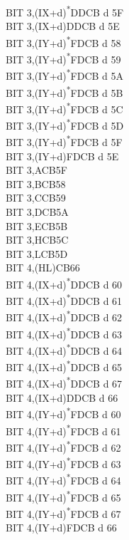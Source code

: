 \documentclass[twoside,openright,a4paper]{book}
\begin{document}
\begin{multicols}{3}
{\begin{tabbing}
	BIT 3,(IX+d)\textsuperscript{*}\>DDCB d 5F\\
	BIT 3,(IX+d)\>DDCB d 5E\\
	BIT 3,(IY+d)\textsuperscript{*}\>FDCB d 58\\
	BIT 3,(IY+d)\textsuperscript{*}\>FDCB d 59\\
	BIT 3,(IY+d)\textsuperscript{*}\>FDCB d 5A\\
	BIT 3,(IY+d)\textsuperscript{*}\>FDCB d 5B\\
	BIT 3,(IY+d)\textsuperscript{*}\>FDCB d 5C\\
	BIT 3,(IY+d)\textsuperscript{*}\>FDCB d 5D\\
	BIT 3,(IY+d)\textsuperscript{*}\>FDCB d 5F\\
	BIT 3,(IY+d)\>FDCB d 5E\\
	BIT 3,A\>CB5F\\
	BIT 3,B\>CB58\\
	BIT 3,C\>CB59\\
	BIT 3,D\>CB5A\\
	BIT 3,E\>CB5B\\
	BIT 3,H\>CB5C\\
	BIT 3,L\>CB5D\\
	BIT 4,(HL)\>CB66\\
	BIT 4,(IX+d)\textsuperscript{*}\>DDCB d 60\\
	BIT 4,(IX+d)\textsuperscript{*}\>DDCB d 61\\
	BIT 4,(IX+d)\textsuperscript{*}\>DDCB d 62\\
	BIT 4,(IX+d)\textsuperscript{*}\>DDCB d 63\\
	BIT 4,(IX+d)\textsuperscript{*}\>DDCB d 64\\
	BIT 4,(IX+d)\textsuperscript{*}\>DDCB d 65\\
	BIT 4,(IX+d)\textsuperscript{*}\>DDCB d 67\\
	BIT 4,(IX+d)\>DDCB d 66\\
	BIT 4,(IY+d)\textsuperscript{*}\>FDCB d 60\\
	BIT 4,(IY+d)\textsuperscript{*}\>FDCB d 61\\
	BIT 4,(IY+d)\textsuperscript{*}\>FDCB d 62\\
	BIT 4,(IY+d)\textsuperscript{*}\>FDCB d 63\\
	BIT 4,(IY+d)\textsuperscript{*}\>FDCB d 64\\
	BIT 4,(IY+d)\textsuperscript{*}\>FDCB d 65\\
	BIT 4,(IY+d)\textsuperscript{*}\>FDCB d 67\\
	BIT 4,(IY+d)\>FDCB d 66\\

\end{tabbing}}
\end{multicols}
\end{document}
